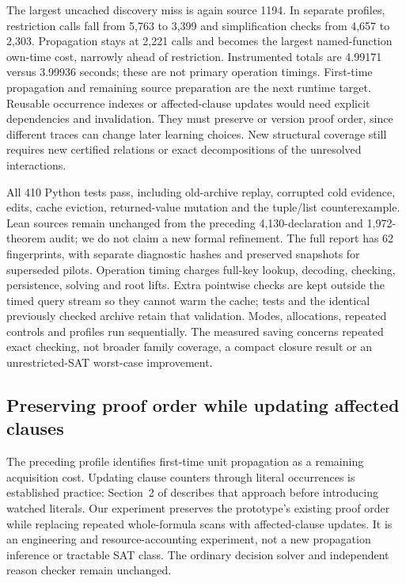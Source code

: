 \documentclass[11pt,a4paper]{article}
\numberwithin{equation}{section}
\theoremstyle{plain}
\theoremstyle{definition}
\theoremstyle{remark}
\begin{document}
The largest uncached discovery miss is again source 1194. In separate profiles, restriction calls fall from 5,763 to 3,399 and simplification checks from 4,657 to 2,303. Propagation stays at 2,221 calls and becomes the largest named-function own-time cost, narrowly ahead of restriction. Instrumented totals are 4.99171 versus 3.99936 seconds; these are not primary operation timings. First-time propagation and remaining source preparation are the next runtime target. Reusable occurrence indexes or affected-clause updates would need explicit dependencies and invalidation. They must preserve or version proof order, since different traces can change later learning choices. New structural coverage still requires new certified relations or exact decompositions of the unresolved interactions.

All 410 Python tests pass, including old-archive replay, corrupted cold evidence, edits, cache eviction, returned-value mutation and the tuple/list counterexample. Lean sources remain unchanged from the preceding 4,130-declaration and 1,972-theorem audit; we do not claim a new formal refinement. The full report has 62 fingerprints, with separate diagnostic hashes and preserved snapshots for superseded pilots. Operation timing charges full-key lookup, decoding, checking, persistence, solving and root lifts. Extra pointwise checks are kept outside the timed query stream so they cannot warm the cache; tests and the identical previously checked archive retain that validation. Modes, allocations, repeated controls and profiles run sequentially. The measured saving concerns repeated exact checking, not broader family coverage, a compact closure result or an unrestricted-SAT worst-case improvement.

\subsection{Preserving proof order while updating affected clauses}
\label{sec:ordered-propagation}

The preceding profile identifies first-time unit propagation as a remaining acquisition cost. Updating clause counters through literal occurrences is established practice: Section~2 of \citet{moskewicz2001chaff} describes that approach before introducing watched literals. Our experiment preserves the prototype's existing proof order while replacing repeated whole-formula scans with affected-clause updates. It is an engineering and resource-accounting experiment, not a new propagation inference or tractable SAT class. The ordinary decision solver and independent reason checker remain unchanged.
\end{document}
